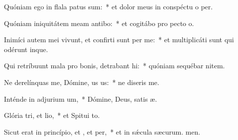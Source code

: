 \item Quóniam ego in flala patus sum:~* et dolor meus in conspéctu o per.
\item Quóniam iniquitátem meam antibo:~* et cogitábo pro pecto o.
\item Inimíci autem mei vivunt, et confirti sunt per me:~* et multiplicáti sunt qui odérunt  inque.
\item Qui retríbuunt mala pro bonis, detrabant hi:~* quóniam sequébar nitem.
\item Ne derelínquas me, Dómine, us us:~* ne diseris  me.
\item Inténde in adjurium um,~* Dómine, Deus, satis æ.
\item Glória tri, et lio,~* et Spitui to.
\item Sicut erat in princípio, et , et per,~* et in sǽcula sæcurum. men.

